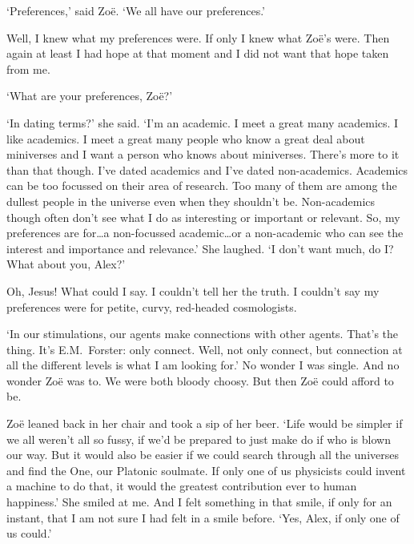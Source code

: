 `Preferences,' said Zoë. `We all have our preferences.'

Well, I knew what my preferences were. If only I knew what Zoë's
were. Then again at least I had hope at that moment and I did not
want that hope taken from me.

`What are your preferences, Zoë?'

`In dating terms?' she said. `I'm an academic. I meet a great many
academics. I like academics. I meet a great many people who know a
great deal about miniverses and I want a person who knows about
miniverses. There's more to it than that though. I've dated
academics and I've dated non-academics. Academics can be too
focussed on their area of research. Too many of them are among the
dullest people in the universe even when they shouldn't be. Non-academics though often don't see
what I do as interesting or important or relevant. So, my
preferences are for\dots a non-focussed academic\dots or a non-academic
who can see the interest and importance and relevance.' She laughed.
`I don't want much, do I? What about you, Alex?'

Oh, Jesus! What could I say. I couldn't tell her the truth. I
couldn't say my preferences were for petite, curvy, red-headed
cosmologists.

`In our stimulations, our agents make connections with other agents.
That's the thing. It's E.M.~Forster: only connect. Well, not
{\twelveit only\/} connect, but connection at all the different
levels is what I am looking for.' No wonder I was single. And no
wonder Zoë was to. We were both bloody choosy. But then Zoë
could afford to be.

Zoë leaned back in her chair and took a sip of her beer. `Life
would be simpler if we all weren't all so fussy, if we'd be prepared
to just make do if who is blown our way. But it would also be easier
if we could search through all the universes and find the One, our
Platonic soulmate. If only one of us physicists could invent a
machine to do that, it would the greatest contribution ever to human
happiness.' She smiled at me. And I felt something in that smile, if
only for an instant, that I am not sure I had felt in a smile
before. `Yes, Alex, if only one of us could.'

